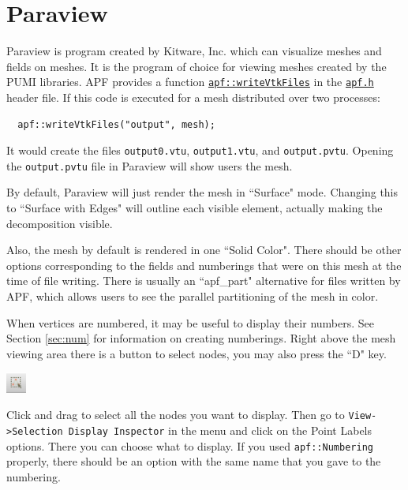 \documentclass{article}
\begin{document}


\appendix

\section{Paraview}
\label{sec:paraview}

Paraview is program created by Kitware, Inc. which can visualize meshes
and fields on meshes.
It is the program of choice for viewing meshes created by the PUMI libraries.
APF provides a function
\href{http://scorec.rpi.edu/~dibanez/core/namespaceapf.html#a060af76b0bb25bffe37dc7a20e121936}{\texttt{apf::writeVtkFiles}}
in the
\href{https://github.com/SCOREC/core/blob/master/apf/apf.h}{\texttt{apf.h}}
header file.
If this code is executed for a mesh distributed over two processes:

\begin{lstlisting}
  apf::writeVtkFiles("output", mesh);
\end{lstlisting}

It would create the files \texttt{output0.vtu}, \texttt{output1.vtu},
and \texttt{output.pvtu}.
Opening the \texttt{output.pvtu} file in Paraview will show users the
mesh.

By default, Paraview will just render the mesh in ``Surface" mode.
Changing this to ``Surface with Edges" will outline each visible element,
actually making the decomposition visible.

Also, the mesh by default is rendered in one ``Solid Color".
There should be other options corresponding to the fields and numberings
that were on this mesh at the time of file writing.
There is usually an ``apf\_part" alternative for files written by APF, which
allows users to see the parallel partitioning of the mesh in color.

When vertices are numbered, it may be useful to display their numbers.
See Section \ref{sec:num} for information on creating numberings.
Right above the mesh viewing area there is a button to select nodes,
you may also press the ``D" key.

\begin{center}
\includegraphics[width=0.05\textwidth]{select_nodes.png}
\end{center}

Click and drag to select all the nodes you want to display.
Then go to \texttt{View->Selection Display Inspector} in the menu and click on
the Point Labels options.
There you can choose what to display.
If you used \texttt{apf::Numbering} properly, there should be an option
with the same name that you gave to the numbering.
\end{document}

